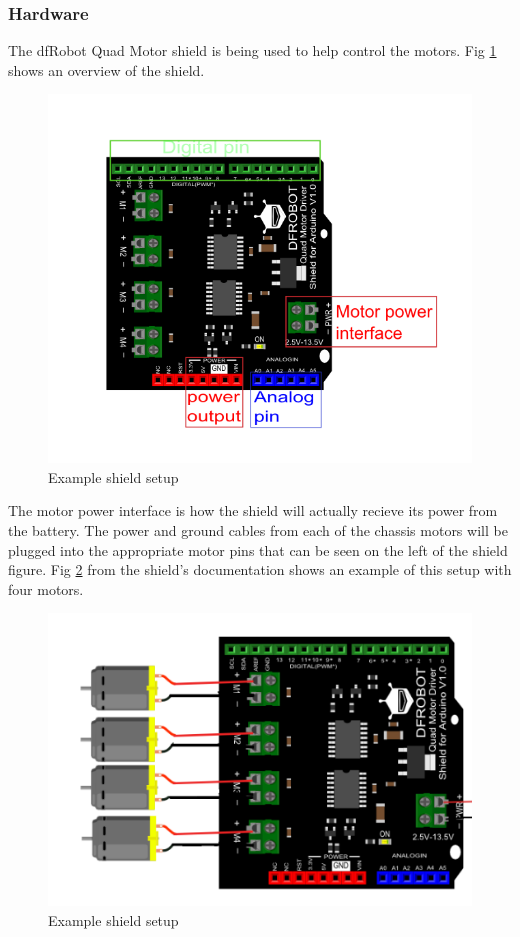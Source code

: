 				\subsubsection{Hardware}
				The dfRobot Quad Motor shield is being used to help control the motors. Fig \ref{fig:shield} shows an overview of the shield.
				\begin{figure}[h]
					\centering
					\includegraphics[width=.7\linewidth]{SYNTHESIS/QuadMotorDriverShield.png}
					\caption{Example shield setup}
					\label{fig:shield}
				\end{figure}
			
				The motor power interface is how the shield will actually recieve its power from the battery. The power and ground cables from each of the chassis motors will be plugged into the appropriate motor pins that can be seen on the left of the shield figure. Fig \ref{fig:shieldsetup} from the shield's documentation shows an example of this setup with four motors.
				
				\begin{figure}[h]
					\centering
					\includegraphics[width=.7\linewidth]{SYNTHESIS/shield_connection.png}
					\caption{Example shield setup}
					\label{fig:shieldsetup}
				\end{figure}
				
